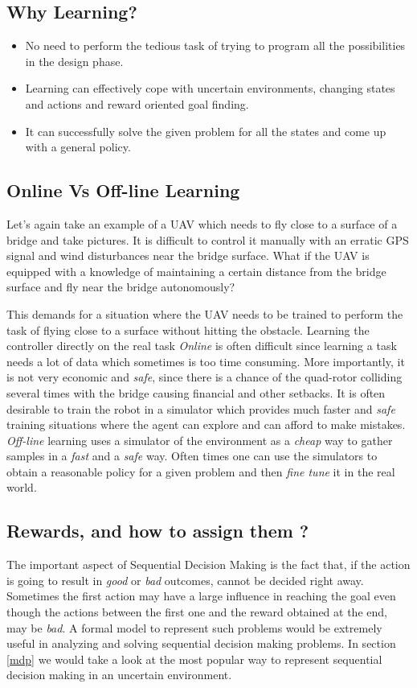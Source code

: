 \documentclass[12pt]{report}
\begin{document}
\subsection{Why Learning?} \label{whyLearning}
\begin{itemize}
\item No need to perform the tedious task of trying to program all the possibilities in the design phase.
\item Learning can effectively cope with uncertain environments, changing states and actions and reward oriented goal finding.
\item It can successfully solve the given problem for all the states and come up with a general policy. 
\end{itemize}

\subsection{Online Vs Off-line Learning}
Let's again take an example of a UAV which needs to fly close to a surface of a bridge and take pictures. It is difficult to control it manually with an erratic GPS signal and wind disturbances near the bridge surface. What if the UAV is equipped with a knowledge of maintaining a certain distance from the bridge surface and fly near the bridge autonomously? \par This demands for a situation where the UAV needs to be trained to perform the task of flying close to a surface without hitting the obstacle. Learning the controller directly on the real task \textit{Online} is often difficult since learning a task needs a lot of data which sometimes is too time consuming. More importantly, it is not very economic and \textit{safe}, since there is a chance of the quad-rotor colliding several times with the bridge causing financial and other setbacks. It is often desirable to train the robot in a simulator which provides much faster and \textit{safe} training situations where the agent can explore and can afford to make mistakes. \textit{Off-line} learning uses a simulator of the environment as a \textit{cheap} way to gather samples in a \textit{fast} and a \textit{safe} way. Often times one can use the simulators to obtain a reasonable policy for a given problem and then \textit{fine tune} it in the real world.

\subsection{Rewards, and how to assign them ?}
The important aspect of Sequential Decision Making is the fact that, if the action is going to result in \textit{good} or \textit{bad} outcomes, cannot be decided right away. Sometimes the first action may have a large influence in reaching the goal even though the actions between the first one and the reward obtained at the end, may be \textit{bad}. A formal model to represent such problems would be extremely useful in analyzing and solving sequential decision making problems. In section \ref{mdp} we would take a look at the most popular way to represent sequential decision making in an uncertain environment.
\end{document}
